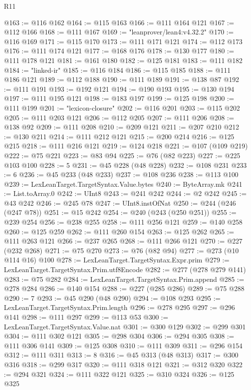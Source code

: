 \begin{lexlean}{R11}
\begin{coremodule}
@163 := @116 @162
@164 := @115 @163
@166 := @111 @164 @121
@167 := @112 @166
@168 := @111 @167
@169 := "leanprover/lean4:v4.32.2"
@170 := @116 @169
@171 := @115 @170
@173 := @111 @171 @121
@174 := @112 @173
@176 := @111 @174 @121
@177 := @168 @176
@178 := @130 @177
@180 := @111 @178 @121
@181 := @161 @180
@182 := @125 @181
@183 := @111 @182
@184 := "linked-ir"
@185 := @116 @184
@186 := @115 @185
@188 := @111 @186 @121
@189 := @112 @188
@190 := @111 @189
@191 := @138 @87
@192 := @111 @191
@193 := @192 @121
@194 := @190 @193
@195 := @130 @194
@197 := @111 @195 @121
@198 := @183 @197
@199 := @125 @198
@200 := @111 @199
@201 := "lexicon-closure"
@202 := @116 @201
@203 := @115 @202
@205 := @111 @203 @121
@206 := @112 @205
@207 := @111 @206
@208 := @138 @92
@209 := @111 @208
@210 := @209 @121
@211 := @207 @210
@212 := @130 @211
@214 := @111 @212 @121
@215 := @200 @214
@216 := @125 @215
@218 := @111 @216 @121
@219 := @124 @218
@221 := @107 (@109 @219)
@222 := @75 @221
@223 := @83 @94
@225 := @76 (@82 @223)
@227 := @225 @103 @100
@228 := 5
@231 := @45 @228 (@48 @228)
@232 := @108 @231
@233 := 6
@236 := @45 @233 (@48 @233)
@237 := @108 @236
@238 := @113 @100
@239 := LexLeanTarget.TargetSyntax.Value.bytes
@240 := ByteArray.mk
@241 := List.toArray.{0}
@242 := UInt8
@243 := @241 @242
@244 := @2 @242
@245 := @43 @242
@246 := @245 @78
@247 := UInt8.instOfNat
@250 := @244 (@246 (@247 @78))
@251 := @15 @242
@254 := @240 (@243 (@250 @251))
@255 := @239 @254
@256 := @238 @255
@258 := @111 @256 @121
@259 := @140 @258
@260 := @125 @259
@262 := @111 @260 @154
@263 := @125 @262
@265 := @111 @263 @121
@266 := @237 @265
@268 := @111 @266 @121
@270 := @227 (@232 @268)
@271 := @75 @270
@273 := @76 (@82 @94)
@277 := @273 (@10 @114 @16) @100
@278 := LexLeanTarget.TargetSyntax.Expr.prim
@279 := LexLeanTarget.TargetSyntax.Prim.utf8Encode
@282 := @277 (@278 @279 @141)
@283 := @75 @282
@284 := LexLeanTarget.TargetSyntax.Prim.append
@285 := @278 @284
@286 := @140 @154
@288 := @227 (@285 @286)
@289 := @75 @288
@290 := 7
@293 := @45 @290 (@48 @290)
@294 := @108 @293
@295 := LexLeanTarget.TargetSyntax.Prim.length
@296 := @278 @295
@297 := @296 @141
@298 := @111 @297
@299 := @113 @53
@300 := LexLeanTarget.TargetSyntax.Value.nat
@301 := @300 @129
@302 := @299 @301
@304 := @111 @302 @121
@305 := @298 @304
@306 := @294 @305
@308 := @111 @306 @141
@309 := @125 @308
@310 := @111 @309
@311 := @296 @154
@312 := @111 @311
@313 := 8
@316 := @45 @313 (@48 @313)
@317 := @300 @316
@318 := @299 @317
@320 := @111 @318 @121
@321 := @312 @320
@322 := @294 @321
@324 := @111 @322 @121
@325 := @310 @324
@326 := @125 @325

\end{coremodule}
\end{lexlean}
